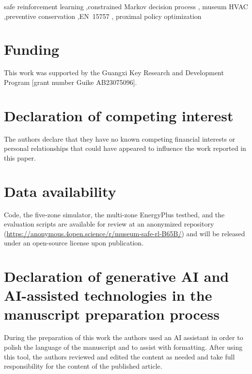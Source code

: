 \documentclass[a4paper,fleqn]{cas-sc}
\begin{document}
\begin{keywords}
safe reinforcement learning \sep constrained Markov decision process \sep
museum HVAC \sep preventive conservation \sep EN~15757 \sep
proximal policy optimization
\end{keywords}

\maketitle



\section*{Funding}
This work was supported by the Guangxi Key Research and Development
Program [grant number Guike AB23075096].

\section*{Declaration of competing interest}
The authors declare that they have no known competing financial
interests or personal relationships that could have appeared to
influence the work reported in this paper.

\section*{Data availability}
Code, the five-zone simulator, the multi-zone EnergyPlus testbed, and the
evaluation scripts are available for review at an anonymized repository
(\url{https://anonymous.4open.science/r/museum-safe-rl-B65B/}) and will
be released under an open-source license upon publication.

\section*{Declaration of generative AI and AI-assisted technologies in the manuscript preparation process}
During the preparation of this work the authors used an AI assistant in
order to polish the language of the manuscript and to assist with
formatting. After using this tool, the authors reviewed and edited the
content as needed and take full responsibility for the content of the
published article.



\end{document}
